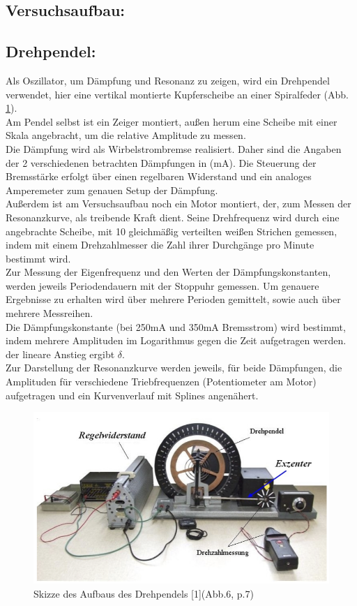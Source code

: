 \documentclass[12pt,a4paper]{article}
\begin{document}
\begin{multicols}{2}
\section{Versuchsaufbau:}
\subsection{Drehpendel:}
Als Oszillator, um Dämpfung und Resonanz zu zeigen, wird ein Drehpendel verwendet, hier eine vertikal montierte Kupferscheibe an einer Spiralfeder (Abb. \ref{fig:drehpendel_skizze}).\\
Am Pendel selbst ist ein Zeiger montiert, außen herum eine Scheibe mit einer Skala angebracht, um die relative Amplitude zu messen.\\
Die Dämpfung wird als Wirbelstrombremse realisiert. Daher sind die Angaben der 2 verschiedenen betrachten Dämpfungen in (mA). Die Steuerung der Bremsstärke erfolgt über einen regelbaren Widerstand und ein analoges Amperemeter zum genauen Setup der Dämpfung.\\
Außerdem ist am Versuchsaufbau noch ein Motor montiert, der, zum Messen der Resonanzkurve, als treibende Kraft dient. Seine Drehfrequenz wird durch eine angebrachte Scheibe, mit 10 gleichmäßig verteilten weißen Strichen gemessen, indem mit einem Drehzahlmesser die Zahl ihrer Durchgänge pro Minute bestimmt wird.\\

Zur Messung der Eigenfrequenz und den Werten der Dämpfungskonstanten, werden jeweils Periodendauern mit der Stoppuhr gemessen. Um genauere Ergebnisse zu erhalten wird über mehrere Perioden gemittelt, sowie auch über mehrere Messreihen.\\
Die Dämpfungskonstante (bei 250mA und 350mA Bremsstrom) wird bestimmt, indem mehrere Amplituden im Logarithmus gegen die Zeit aufgetragen werden. der lineare Anstieg ergibt $\delta$.\\
Zur Darstellung der Resonanzkurve werden jeweils, für beide Dämpfungen, die Amplituden für verschiedene Triebfrequenzen (Potentiometer am Motor) aufgetragen und ein Kurvenverlauf mit Splines angenähert.
\begin{figure}[H]
	\centering
	\includegraphics[scale=0.4]{./figure/drehpendel.png}
	\caption{Skizze des Aufbaus des Drehpendels [1](Abb.6, p.7)}
	\label{fig:drehpendel_skizze}
\end{figure}

\end{multicols}
\end{document}

